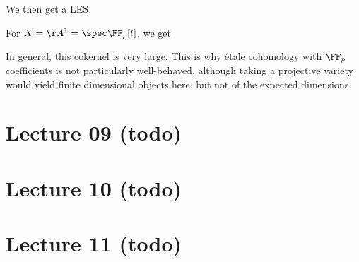 \begin{example}[?]
We then get a LES

\begin{center}
\end{center}

For \(X = \AA^1 = \spec \FF_p[t]\), we get

\begin{center}
\end{center}

In general, this cokernel is very large. This is why étale cohomology
with \(\FF_p\) coefficients is not particularly well-behaved, although
taking a projective variety would yield finite dimensional objects here,
but not of the expected dimensions.

\end{example}

\hypertarget{lecture-09-todo}{%
\section{Lecture 09 (todo)}\label{lecture-09-todo}}

\hypertarget{lecture-10-todo}{%
\section{Lecture 10 (todo)}\label{lecture-10-todo}}

\hypertarget{lecture-11-todo}{%
\section{Lecture 11 (todo)}\label{lecture-11-todo}}

